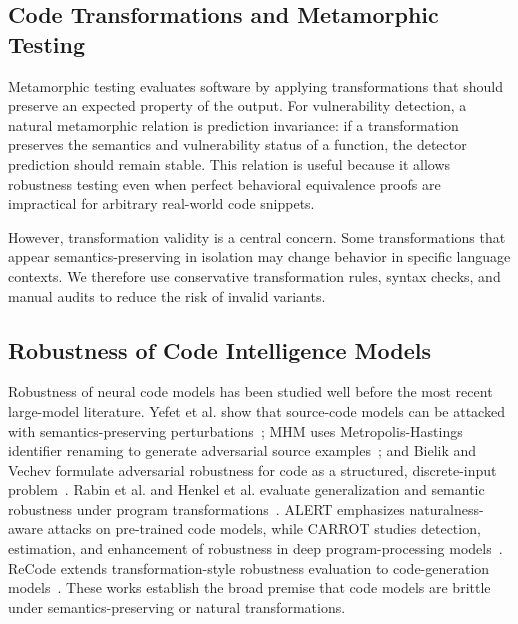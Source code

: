 \documentclass[a4paper,fleqn]{cas-dc}
\begin{document}
\subsection{Code Transformations and Metamorphic Testing}

Metamorphic testing evaluates software by applying transformations that should
preserve an expected property of the output. For vulnerability detection, a
natural metamorphic relation is prediction invariance: if a transformation
preserves the semantics and vulnerability status of a function, the detector
prediction should remain stable. This relation is useful because it allows
robustness testing even when perfect behavioral equivalence proofs are
impractical for arbitrary real-world code snippets.

However, transformation validity is a central concern. Some transformations
that appear semantics-preserving in isolation may change behavior in specific
language contexts. We therefore use conservative transformation rules, syntax
checks, and manual audits to reduce the risk of invalid variants.

\subsection{Robustness of Code Intelligence Models}

Robustness of neural code models has been studied well before the most recent
large-model literature. Yefet et al. show that source-code models can be
attacked with semantics-preserving perturbations~\cite{yefet2020adversarial};
MHM uses Metropolis-Hastings identifier renaming to generate adversarial source
examples~\cite{zhang2020mhm}; and Bielik and Vechev formulate adversarial
robustness for code as a structured, discrete-input problem~\cite{bielik2020adversarial}.
Rabin et al. and Henkel et al. evaluate generalization and semantic robustness
under program transformations~\cite{rabin2021generalizability,henkel2022semantic}.
ALERT emphasizes naturalness-aware attacks on pre-trained code models, while
CARROT studies detection, estimation, and enhancement of robustness in deep
program-processing models~\cite{yang2022alert,zhang2022carrot}. ReCode
extends transformation-style robustness evaluation to code-generation
models~\cite{wang2023recode}. These works establish the broad premise that
code models are brittle under semantics-preserving or natural transformations.
\end{document}
